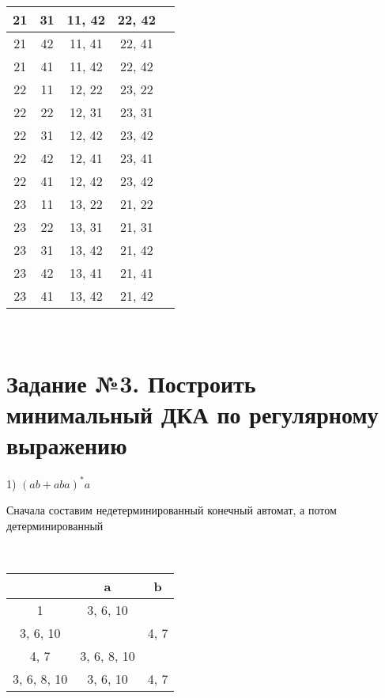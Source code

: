 \documentclass[a4paper,12pt]{article}
\begin{document}
\begin{center}
\begin{tabular}{ |c|c|c|c|c| }
        \hline
        21 & 31 & 11, 42 & 22, 42 \\
        \hline
        21 & 42 & 11, 41 & 22, 41 \\
        \hline
        21 & 41 & 11, 42  & 22, 42 \\
        \hline
        22 & 11 & 12, 22 & 23, 22 \\
        \hline
        22 & 22 & 12, 31 & 23, 31 \\
        \hline
        22 & 31 & 12, 42 & 23, 42 \\
        \hline
        22 & 42 & 12, 41 & 23, 41 \\
        \hline
        22 & 41 & 12, 42 & 23, 42 \\
        \hline
        23 & 11 & 13, 22 & 21, 22 \\
        \hline
        23 & 22 & 13, 31 & 21, 31 \\
        \hline
        23 & 31 & 13, 42 & 21, 42 \\
        \hline
        23 & 42 & 13, 41 & 21, 41 \\
        \hline
        23 & 41 & 13, 42 & 21, 42 \\
        \hline
    \end{tabular}
\end{center} 


 \\





\section{ Задание №3. Построить минимальный ДКА по регулярному выражению}

1) $ (ab + aba)^{*}a $

Сначала составим недетерминированный конечный автомат, а потом детерминированный

 \\

\begin{center}
    \begin{tabular}{ |c|c|c| } 
        \hline
         & a & b  \\
        \hline
        1 & 3, 6, 10 & \\
        \hline
        3, 6, 10 &  & 4, 7 \\
        \hline
        4, 7 & 3, 6, 8, 10 & \\
        \hline
        3, 6, 8, 10 & 3, 6, 10 & 4, 7 \\
        \hline
    \end{tabular}
\end{center} 
\end{document}
